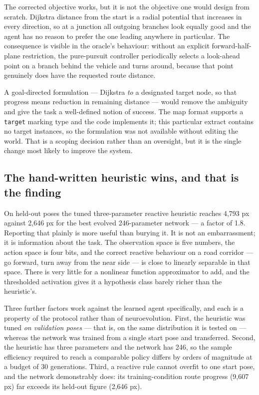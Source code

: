 \documentclass[conference]{IEEEtran}
\begin{document}
The corrected objective works, but it is not the objective one would design from scratch. Dijkstra distance from the start is a radial potential that increases in every direction, so at a junction all outgoing branches look equally good and the agent has no reason to prefer the one leading anywhere in particular. The consequence is visible in the oracle's behaviour: without an explicit forward-half-plane restriction, the pure-pursuit controller periodically selects a look-ahead point on a branch behind the vehicle and turns around, because that point genuinely does have the requested route distance.

A goal-directed formulation — Dijkstra \emph{to} a designated target node, so that progress means reduction in remaining distance — would remove the ambiguity and give the task a well-defined notion of success. The map format supports a \texttt{target} marking type and the code implements it; this particular extract contains no target instances, so the formulation was not available without editing the world. That is a scoping decision rather than an oversight, but it is the single change most likely to improve the system.

\subsection{The hand-written heuristic wins, and that is the finding}

On held-out poses the tuned three-parameter reactive heuristic reaches 4,793 px against 2,646 px for the best evolved 246-parameter network — a factor of 1.8. Reporting that plainly is more useful than burying it. It is not an embarrassment; it is information about the task. The observation space is five numbers, the action space is four bits, and the correct reactive behaviour on a road corridor — go forward, turn away from the near side — is close to linearly separable in that space. There is very little for a nonlinear function approximator to add, and the thresholded activation gives it a hypothesis class barely richer than the heuristic's.

Three further factors work against the learned agent specifically, and each is a property of the protocol rather than of neuroevolution. First, the heuristic was tuned \emph{on validation poses} — that is, on the same distribution it is tested on — whereas the network was trained from a single start pose and transferred. Second, the heuristic has three parameters and the network has 246, so the sample efficiency required to reach a comparable policy differs by orders of magnitude at a budget of 30 generations. Third, a reactive rule cannot overfit to one start pose, and the network demonstrably does: its training-condition route progress (9,607 px) far exceeds its held-out figure (2,646 px).
\end{document}
